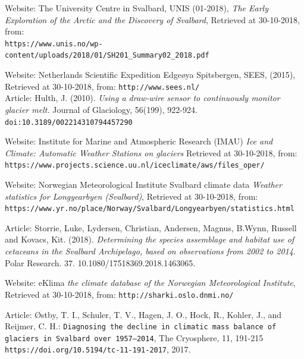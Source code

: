 \documentclass[11pt]{report}
\begin{document}
\begin{thebibliography}{9}
Website: The University Centre in Svalbard, UNIS (01-2018), 
\textit{The Early Exploration of the Arctic and the Discovery of
Svalbard},
Retrieved at 30-10-2018, from:\\
\texttt{\small{https://www.unis.no/wp-content/uploads/2018/01/SH201\_Summary02\_2018.pdf}}

Website: Netherlands Scientific Expedition Edgeøya Spitsbergen, SEES, (2015), \\ Retrieved at 30-10-2018, from:
\texttt{\small{http://www.sees.nl/}}\\

Article: Hulth, J. (2010). 
\textit{Using a draw-wire sensor to continuously monitor glacier melt.} Journal of Glaciology, 56(199), 922-924. 
\texttt{doi:10.3189/002214310794457290}

Website: Institute for Marine and Atmospheric Research (IMAU)
\textit{Ice and Climate: Automatic Weather Stations on glaciers}
Retrieved at 30-10-2018, from:
\texttt{https://www.projects.science.uu.nl/iceclimate/aws/files\_oper/}

Website: Norwegian Meteorological Institute Svalbard climate data
\textit{Weather statistics for Longyearbyen (Svalbard)},
Retrieved at 30-10-2018, from:
\texttt{https://www.yr.no/place/Norway/Svalbard/Longyearbyen/statistics.html}


Article: Storrie, Luke, Lydersen, Christian, Andersen, Magnus, B.Wynn, Russell and Kovacs, Kit. (2018). 
\textit{Determining the species assemblage and habitat use of cetaceans in the Svalbard Archipelago, based on observations from 2002 to 2014.} Polar Research. 37. 10.1080/17518369.2018.1463065. 

Website: eKlima \textit{the climate database of the Norwegian Meteorological Institute}, Retrieved at 30-10-2018, from:
\texttt{http://sharki.oslo.dnmi.no/}

Article: Østby, T. I., Schuler, T. V., Hagen, J. O., Hock, R., Kohler, J., and Reijmer, C. H.: \texttt{Diagnosing the decline in climatic mass balance of glaciers in Svalbard over 1957–2014}, 
The Cryosphere, 11, 191-215 \texttt{https://doi.org/10.5194/tc-11-191-2017}, 2017.

\end{thebibliography}


\end{document}
